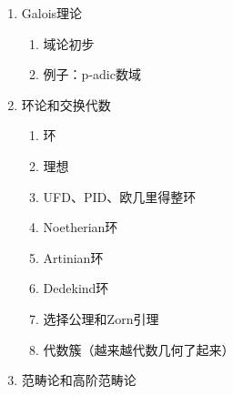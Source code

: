 \documentclass[../main.tex]{subfiles}
\begin{document}
\begin{multicols}{2}
\begin{enumerate}
\begin{enumerate}
    \end{enumerate}
    \item Galois理论
    \begin{enumerate}
        \item 域论初步
        \item 例子：p-adic数域
    \end{enumerate}
    \item 环论和交换代数
    \begin{enumerate}
        \item 环
        \item 理想
        \item UFD、PID、欧几里得整环
        \item Noetherian环
        \item Artinian环
        \item Dedekind环
        \item 选择公理和Zorn引理
        \item 代数簇（越来越代数几何了起来）
    \end{enumerate}
    \item 范畴论和高阶范畴论
\end{enumerate}
\end{multicols}
\end{document}
